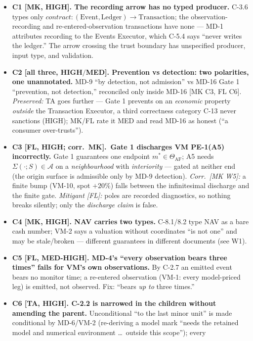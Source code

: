 \begin{itemize}\setlength{\itemsep}{0pt}
  \item \textbf{C1 [MK, HIGH]. The recording arrow has no typed producer.} C-3.6 types only
  $\mathit{contract}:(\mathrm{Event},\mathrm{Ledger})\to\mathrm{Transaction}$; the
  observation-recording and re-entered-observation transactions have none --- MD-1 attributes
  recording to the Events Executor, which C-5.4 says ``never writes the ledger.'' The arrow
  crossing the trust boundary has unspecified producer, input type, and validation.
  \item \textbf{C2 [all three, HIGH$/$MED]. Prevention vs detection: two polarities, one
  unannotated.} MD-9 ``by detection, not admission'' vs MD-16 Gate 1 ``prevention, not
  detection,'' reconciled only inside MD-16 [MK C3, FL C6]. \emph{Preserved:} TA goes further ---
  Gate 1 prevents on an \emph{economic} property \emph{outside} the Transaction Executor, a
  third correctness category C-13 never sanctions (HIGH); MK/FL rate it MED and read MD-16 as
  honest (``a consumer over-trusts'').
  \item \textbf{C3 [FL, HIGH; corr.\ MK].\ Gate 1 discharges VM PE-1(A5) incorrectly.} Gate 1
  guarantees one endpoint $m^\ast\in\Theta_{\mathrm{AF}}$; A5 needs $\Sigma(\cdot;S)\in\mathcal{A}$
  on a \emph{neighbourhood} with \emph{interiority} --- gated at neither end (the origin surface
  is admissible only by MD-9 detection). \emph{Corr.\ [MK W5]:} a finite bump (VM-10, spot
  $+20\%$) falls between the infinitesimal discharge and the finite gate. \emph{Mitigant [FL]:}
  poles are recorded diagnostics, so nothing breaks silently; only the \emph{discharge claim} is
  false.
  \item \textbf{C4 [MK, HIGH]. NAV carries two types.} C-8.1/8.2 type NAV as a bare cash number;
  VM-2 says a valuation without coordinates ``is not one'' and may be stale/broken --- different
  guarantees in different documents (see W1).
  \item \textbf{C5 [FL, MED-HIGH]. MD-4's ``every observation bears three times'' fails for VM's
  own observations.} By C-2.7 an emitted event bears no monitor time; a re-entered observation
  (VM-1: every model-priced leg) is emitted, not observed. Fix: ``bears \emph{up to} three
  times.''
  \item \textbf{C6 [TA, HIGH]. C-2.2 is narrowed in the children without amending the parent.}
  Unconditional ``to the last minor unit'' is made conditional by MD-6/VM-2 (re-deriving a model
  mark ``needs the retained model and numerical environment \dots\ outside this scope''); every

\end{itemize}
